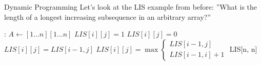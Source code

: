 \documentclass{beamer}
\begin{document}
\begin{frame}[t]{Dynamic Programming}
  Let's look at the LIS example from before:
  ''What is the length of a longest increasing subsequence in an arbitrary array?''
  \pause
  \begin{algorithmic}
    :
        \State $A \gets [1\dotsc n][1\dotsc n]$ 
                    \State $LIS[i][j] = 1$
                \Else 
                    \State $LIS[i][j] = 0$
                \EndIf
            \EndFor
        \EndFor
                    \State $LIS[i][j] = LIS[i - 1, j]$
                \Else
                    \State $LIS[i][j] = \max{ 
                        \begin{cases}
                            LIS[i-1,j]\\
                            LIS[i - 1, i] + 1
                        \end{cases}}$
                \EndIf
            \EndFor
        \EndFor
        \State \Return LIS[n, n]
    \EndProcedure
  
  \end{algorithmic} 
\end{frame}
\end{document}
